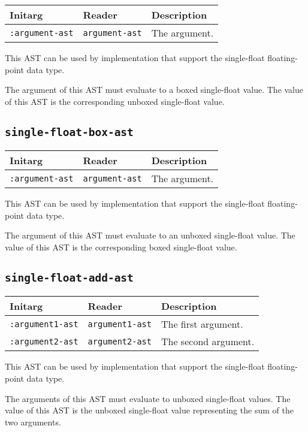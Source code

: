 \begin{tabular}{|l|l|l|}
\hline
Initarg & Reader & Description\\
\hline\hline
\texttt{:argument-ast} & \texttt{argument-ast} & The argument.\\
\hline
\end{tabular}

This AST can be used by implementation that support the single-float
floating-point data type.  

The argument of this AST must evaluate to a boxed single-float value.
The value of this AST is the corresponding unboxed single-float value.

\subsection{\texttt{single-float-box-ast}}
\label{sec-ast-single-float-box}

\begin{tabular}{|l|l|l|}
\hline
Initarg & Reader & Description\\
\hline\hline
\texttt{:argument-ast} & \texttt{argument-ast} & The argument.\\
\hline
\end{tabular}

This AST can be used by implementation that support the single-float
floating-point data type.  

The argument of this AST must evaluate to an unboxed single-float
value.  The value of this AST is the corresponding boxed single-float
value.

\subsection{\texttt{single-float-add-ast}}
\label{sec-ast-single-float-add}

\begin{tabular}{|l|l|l|}
\hline
Initarg & Reader & Description\\
\hline\hline
\texttt{:argument1-ast} & \texttt{argument1-ast} & The first argument.\\
\hline
\texttt{:argument2-ast} & \texttt{argument2-ast} & The second argument.\\
\hline
\end{tabular}

This AST can be used by implementation that support the single-float
floating-point data type.  

The arguments of this AST must evaluate to unboxed single-float
values.  The value of this AST is the unboxed single-float value
representing the sum of the two arguments.

